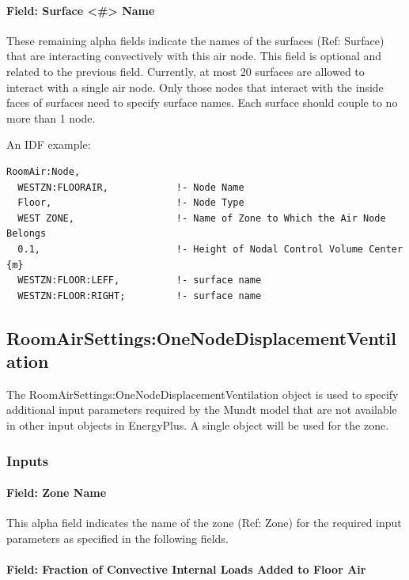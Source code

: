 \paragraph{Field: Surface \textless{}\#\textgreater{} Name}\label{field-surface-name-004}

These remaining alpha fields indicate the names of the surfaces (Ref: Surface) that are interacting convectively with this air node. This field is optional and related to the previous field. Currently, at most 20 surfaces are allowed to interact with a single air node. Only those nodes that interact with the inside faces of surfaces need to specify surface names. Each surface should couple to no more than 1 node.

An IDF example:

\begin{lstlisting}
RoomAir:Node,
  WESTZN:FLOORAIR,            !- Node Name
  Floor,                      !- Node Type
  WEST ZONE,                  !- Name of Zone to Which the Air Node Belongs
  0.1,                        !- Height of Nodal Control Volume Center {m}
  WESTZN:FLOOR:LEFF,          !- surface name
  WESTZN:FLOOR:RIGHT;         !- surface name
\end{lstlisting}

\subsection{RoomAirSettings:OneNodeDisplacementVentilation}\label{roomairsettingsonenodedisplacementventilation}

The RoomAirSettings:OneNodeDisplacementVentilation object is used to specify additional input parameters required by the Mundt model that are not available in other input objects in EnergyPlus. A single object will be used for the zone.

\subsubsection{Inputs}\label{inputs-7-022}

\paragraph{Field: Zone Name}\label{field-zone-name-3-005}

This alpha field indicates the name of the zone (Ref: Zone) for the required input parameters as specified in the following fields.

\paragraph{Field: Fraction of Convective Internal Loads Added to Floor Air}\label{field-fraction-of-convective-internal-loads-added-to-floor-air}

